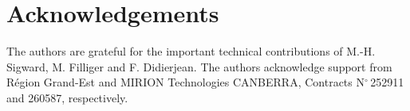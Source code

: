 \section{Acknowledgements}
\label{sec:acknowledgements}
The authors are grateful for the important technical contributions of M.-H. Sigward, M. Filliger and F. Didierjean. The authors acknowledge support from Région Grand-Est and MIRION Technologies CANBERRA, Contracts N$^\circ$\,252911 and 260587, respectively.

\FloatBarrier
%





